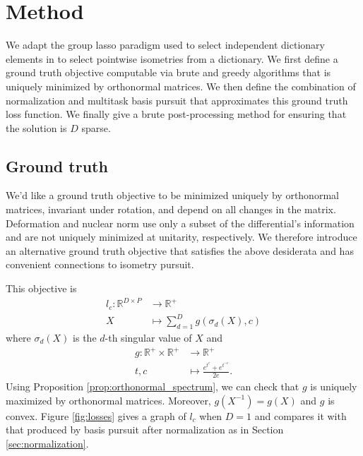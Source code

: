 \section{Method}

We adapt the group lasso paradigm used to select independent dictionary elements in \citet{Koelle2022-ju, Koelle2024-no} to select pointwise isometries from a dictionary.
We first define a ground truth objective computable via brute and greedy algorithms that is uniquely minimized by orthonormal matrices.
We then define the combination of normalization and multitask basis pursuit that approximates this ground truth loss function.
We finally give a brute post-processing method for ensuring that the solution is $D$ sparse.

\subsection{Ground truth}
\label{sec:ground_truth}

We'd like a ground truth objective to be minimized uniquely by orthonormal matrices, invariant under rotation, and depend on all changes in the matrix.
Deformation \citep{Kohli2021-lr} and nuclear norm \citep{Boyd2004-ql} use only a subset of the differential's information and are not uniquely minimized at unitarity, respectively.
We therefore introduce an alternative ground truth objective that satisfies the above desiderata and has convenient connections to isometry pursuit.

This objective is
\begin{align}
l_{c}: \mathbb R^{D \times P} &\to \mathbb R^{+} \\
X &\mapsto \sum_{d = 1}^D g(\sigma_d( X), c)
\end{align}
where $\sigma_d ( X)$ is the $d$-th singular value of $ X$ and
\begin{align}
g: \mathbb R^+ \times \mathbb R^+ &\to \mathbb R^+ \\
t,c &\mapsto \frac{e^{t^c} + e^{t^{-c}}}{2e}.
\end{align}
Using Proposition \ref{prop:orthonormal_spectrum}, we can check that $g$ is uniquely maximized by orthonormal matrices.
Moreover, $g( X^{-1}) = g( X)$ and $g$ is convex.
Figure \ref{fig:losses} gives a graph of $l_c$ when $D=1$ and compares it with that produced by basis pursuit after normalization as in Section \ref{sec:normalization}.

